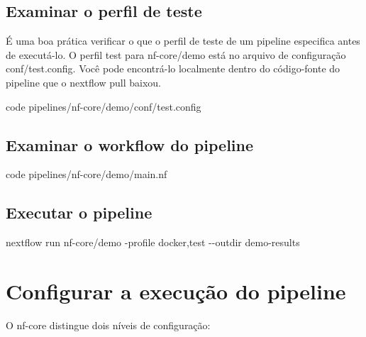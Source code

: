 \documentclass[
  brazilian,
  letterpaper,
  DIV=11,
  numbers=noendperiod]{scrreprt}
\newenvironment{Shaded}{\begin{snugshade}}{\end{snugshade}}
\newcommand{\AttributeTok}[1]{\textcolor[rgb]{0.40,0.45,0.13}{#1}}
\newcommand{\ExtensionTok}[1]{\textcolor[rgb]{0.00,0.23,0.31}{#1}}
\newcommand{\NormalTok}[1]{\textcolor[rgb]{0.00,0.23,0.31}{#1}}
\begin{document}
\section{Examinar o perfil de teste}\label{examinar-o-perfil-de-teste}

É uma boa prática verificar o que o perfil de teste de um pipeline
especifica antes de executá-lo. O perfil test para nf-core/demo está no
arquivo de configuração conf/test.config. Você pode encontrá-lo
localmente dentro do código-fonte do pipeline que o nextflow pull
baixou.

\begin{Shaded}
\begin{Highlighting}[]
\ExtensionTok{code}\NormalTok{ pipelines/nf{-}core/demo/conf/test.config}
\end{Highlighting}
\end{Shaded}

\section{Examinar o workflow do
pipeline}\label{examinar-o-workflow-do-pipeline}

\begin{Shaded}
\begin{Highlighting}[]
\ExtensionTok{code}\NormalTok{ pipelines/nf{-}core/demo/main.nf}
\end{Highlighting}
\end{Shaded}

\section{Executar o pipeline}\label{executar-o-pipeline}

\begin{Shaded}
\begin{Highlighting}[]
\ExtensionTok{nextflow}\NormalTok{ run nf{-}core/demo }\AttributeTok{{-}profile}\NormalTok{ docker,test }\AttributeTok{{-}{-}outdir}\NormalTok{ demo{-}results}
\end{Highlighting}
\end{Shaded}

\chapter{Configurar a execução do
pipeline}\label{configurar-a-execuuxe7uxe3o-do-pipeline}

O nf-core distingue dois níveis de configuração:
\end{document}
